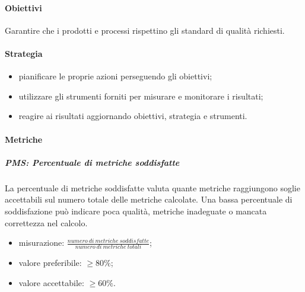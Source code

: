 		\paragraph{Obiettivi}
		Garantire che i prodotti e processi rispettino gli standard di qualità richiesti.
		\paragraph{Strategia}
		\begin{itemize}
			\item pianificare le proprie azioni perseguendo gli obiettivi;
			\item utilizzare gli strumenti forniti per misurare e monitorare i risultati;
			\item reagire ai risultati aggiornando obiettivi, strategia e strumenti.
		\end{itemize}
		\paragraph{Metriche}
			\subparagraph{PMS: Percentuale di metriche soddisfatte}
			La percentuale di metriche soddisfatte valuta quante metriche raggiungono soglie accettabili sul numero totale delle metriche calcolate. Una bassa percentuale di soddisfazione può indicare poca qualità, metriche inadeguate o mancata correttezza nel calcolo.
			\begin{itemize}
				\item misurazione: $\frac{numero\ di\ metriche\ soddisfatte}{numero\ di\ metriche\ totali} $;
				\item valore preferibile: $ \geq 80\%$;
				\item valore accettabile: $ \geq 60\%$.
			\end{itemize}
		